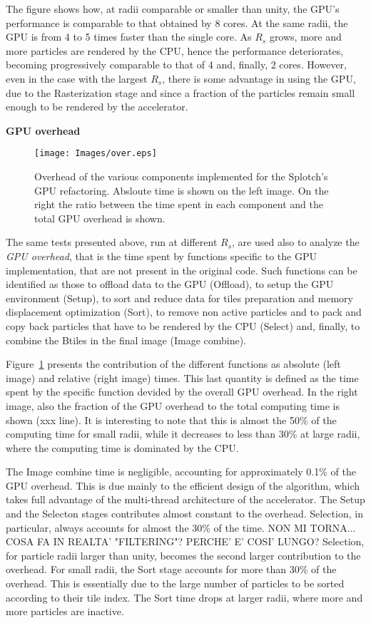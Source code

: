 \documentclass[11pt]{article}
\begin{document}
The figure shows how, at radii comparable 
or smaller than unity, the GPU's performance is 
comparable to that obtained by 8 cores.
At the same radii, the GPU is from 4 to 5 times faster than the single 
core. As $R_s$ grows, more and more particles are rendered by the CPU, hence 
the performance deteriorates, becoming progressively comparable to that
of 4 and, finally, 2 cores. However, even in
the case with the largest $R_s$, there is some advantage in using the GPU, 
due to the Rasterization stage and since a fraction of the particles 
remain small enough to be rendered by the accelerator.

{\bf GPU overhead}

\begin{figure}
\centering
\texttt{[image: Images/over.eps]}
\caption{Overhead of the various components implemented for the Splotch's
GPU refactoring. Absloute time is shown on the left image. On the right
the ratio between the time spent in each component and the total GPU 
overhead is shown.}
\label{fig:over}
\end{figure}

The same tests presented above, run at different $R_s$, are used also to
analyze the {\it GPU overhead}, that is the time spent by functions specific
to the GPU implementation, that are not present in the original code. Such functions can 
be identified as those to offload data to the GPU (Offload),
to setup the GPU environment (Setup),
to sort and reduce data for tiles preparation and memory displacement optimization (Sort),
to remove non active particles and to pack and copy back particles that have to 
be rendered by the CPU (Select) and, finally,
to combine the Btiles in the final image (Image combine).   

Figure~\ref{fig:over} presents the contribution of the different functions
as absolute (left image) and relative (right image) times. This last 
quantity is defined as the time spent by the specific function devided by
the overall GPU overhead. In the right image, also the fraction of the GPU
overhead to the total computing time is shown (xxx line). It is interesting to 
note that this is almost the 50\% of the computing time for small radii,
while it decreases to less than 30\% at large radii, where the
computing time is dominated by the CPU. 

The Image combine time is negligible, accounting for approximately 0.1\% of 
the GPU overhead. This is due mainly to the efficient design of the 
algorithm, which takes full advantage of the multi-thread architecture 
of the accelerator. The Setup and the Selecton stages contributes 
almost constant to the overhead. Selection, in particular, 
always accounts for almost the 30\% of the time. NON MI TORNA... COSA FA
IN REALTA' "FILTERING"? PERCHE' E' COSI' LUNGO?
Selection, for particle radii larger than unity, becomes the second 
larger contribution to the overhead. For small radii, the Sort
stage accounts for more than 30\% of the overhead. This is essentially due to 
the large number of particles to be sorted according to their tile index. 
The Sort time drops at larger radii, where more and more particles are
inactive.
 
\end{document}
